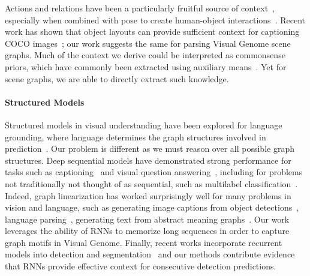 \documentclass[10pt,twocolumn,letterpaper]{article}
\begin{document}
Actions and relations have been a particularly fruitful source of context~\cite{marszalek2009actions, yatskar_situation_2016}, especially when combined with pose to create human-object interactions~\cite{yao2010modeling,chao:iccv2015}. Recent work has shown that object layouts can provide sufficient context for captioning COCO images~\cite{obj2textEMNLP2017,mscoco}; our work suggests the same for parsing Visual Genome scene graphs.
Much of the context we derive could be interpreted as commonsense priors, which have commonly been extracted using auxiliary means~\cite{zhu2014reasoning, viske, neil, Yatskar_VCommonSense_16, emnlp17_zellers}. 
Yet for scene graphs, we are able to directly extract such knowledge.

\paragraph{Structured Models}
Structured models in visual understanding have been explored for language grounding, where language determines the graph structures involved in prediction~\cite{plummer2015flickr30k,fidler_grounding_graph, tellex2011approaching, hu2017learning}.
Our problem is different as we must reason over all possible graph structures. 
Deep sequential models have demonstrated strong performance for tasks such as captioning~\cite{larrycaption,msrcaption, googlecaption, stanfordcaption} and visual question answering~\cite{vqa1,vqa2,vqa3,vqa4,vqa5}, including for problems not traditionally not thought of as sequential, such as multilabel classification~\cite{cnnrnn16}. Indeed, graph linearization has worked surprisingly well for many problems in vision and language, such as generating image captions from object detections~\cite{obj2textEMNLP2017}, language parsing~\cite{vinyals2015grammar}, generating text from abstract meaning graphs~\cite{konstas2017neural}. Our work leverages the ability of RNNs to memorize long sequences in order to capture graph motifs in Visual Genome. Finally, recent works incorporate recurrent models into detection and segmentation~\cite{polygonrnn,ren2016end} and our methods contribute evidence that RNNs provide effective context for consecutive detection predictions.
\end{document}
